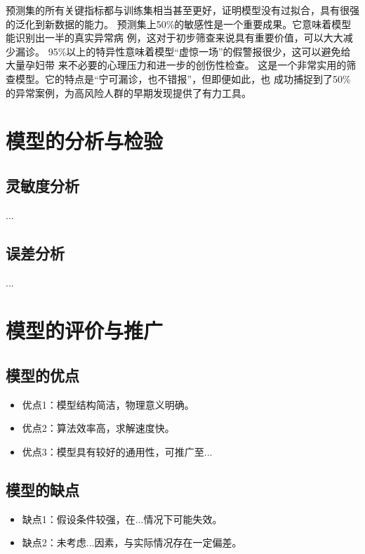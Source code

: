 \documentclass[withoutpreface,notoc]{cumcmthesis}
\begin{document}
	预测集的所有关键指标都与训练集相当甚至更好，证明模型没有过拟合，具有很强
	的泛化到新数据的能力。
	预测集上50\%的敏感性是一个重要成果。它意味着模型能识别出一半的真实异常病
	例，这对于初步筛查来说具有重要价值，可以大大减少漏诊。
	95\%以上的特异性意味着模型“虚惊一场”的假警报很少，这可以避免给大量孕妇带
	来不必要的心理压力和进一步的创伤性检查。
	这是一个非常实用的筛查模型。它的特点是“宁可漏诊，也不错报”，但即便如此，也
	成功捕捉到了50\%的异常案例，为高风险人群的早期发现提供了有力工具。








	
	\section{模型的分析与检验}
	\subsection{灵敏度分析}
	...
	\subsection{误差分析}
	...
	\section{模型的评价与推广}
	\subsection{模型的优点}
	\begin{itemize}[itemindent=2em]
		\item 优点1：模型结构简洁，物理意义明确。
		\item 优点2：算法效率高，求解速度快。
		\item 优点3：模型具有较好的通用性，可推广至...
	\end{itemize}
	\subsection{模型的缺点}
	\begin{itemize}[itemindent=2em]
		\item 缺点1：假设条件较强，在...情况下可能失效。
		\item 缺点2：未考虑...因素，与实际情况存在一定偏差。
	\end{itemize}
\end{document}
